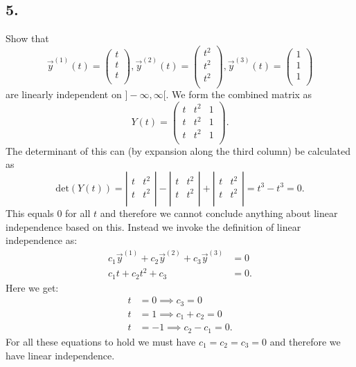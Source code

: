 \subsection*{5.} Show that
\[ 
\Vec{y}^{(1)}(t) = \begin{pmatrix}
t\\
t\\
t\\
\end{pmatrix}, \Vec{y}^{(2)}(t) = \begin{pmatrix}
t^2\\
t^2\\
t^2\\
\end{pmatrix}, \Vec{y}^{(3)}(t) = \begin{pmatrix}
1\\
1\\
1\\
\end{pmatrix}
\]
are linearly independent on $]-\infty,\infty[$.
\bigbreak
We form the combined matrix as
\[ 
Y(t) = \begin{pmatrix}
t & t^2 & 1\\
t & t^2 & 1\\
t & t^2 & 1\\
\end{pmatrix}
.\]
The determinant of this can (by expansion along the third column) be calculated as
\[ 
\mathrm{det}(Y(t)) = \left| \begin{array}{cc}
t & t^2\\
t & t^2\\
\end{array} \right| - \left| \begin{array}{cc}
t & t^2\\
t & t^2\\
\end{array} \right| + \left| \begin{array}{cc}
t & t^2\\
t & t^2\\
\end{array} \right| = t^3 - t^3 = 0
.\]
This equals 0 for all $t$ and therefore we cannot conclude anything about linear independence based on this. Instead we invoke the definition of linear independence as:
\begin{align*}
  c_1 \Vec{y}^{(1)} + c_2 \Vec{y}^{(2)} + c_3 \Vec{y}^{(3)} &= 0 \\
  c_1 t + c_2 t^2 + c_3 &= 0
.\end{align*}
Here we get:
\begin{align*}
  t &= 0 \implies c_3 = 0 \\
  t &= 1 \implies c_1 + c_2 = 0 \\
  t &= -1 \implies c_2 - c_1 = 0
.\end{align*}
For all these equations to hold we must have $c_1 = c_2 = c_3 = 0$ and therefore we have linear independence.


